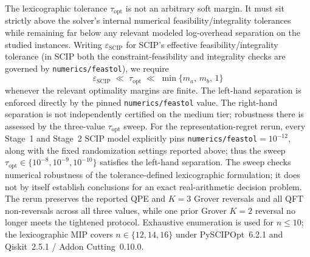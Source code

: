 \documentclass[11pt]{article}
\begin{document}
The lexicographic tolerance $\tau_{\mathrm{opt}}$ is not an arbitrary soft margin. It must sit strictly above the solver's internal numerical feasibility/integrality tolerances while remaining far below any relevant modeled log-overhead separation on the studied instances. Writing $\varepsilon_{\mathrm{SCIP}}$ for SCIP's effective feasibility/integrality tolerance (in SCIP both the constraint-feasibility and integrality checks are governed by \texttt{numerics/feastol}), we require
\begin{equation}
  \varepsilon_{\mathrm{SCIP}}
  \;\ll\;
  \tau_{\mathrm{opt}}
  \;\ll\;
  \min\bigl\{m_a,\,m_b,\,1\bigr\}
  \label{eq:tau-hierarchy}
\end{equation}
whenever the relevant optimality margins are finite. The left-hand separation is enforced directly by the pinned \texttt{numerics/feastol} value. The right-hand separation is not independently certified on the medium tier; robustness there is assessed by the three-value $\tau_{\mathrm{opt}}$ sweep. For the representation-regret rerun, every Stage~1 and Stage~2 SCIP model explicitly pins \texttt{numerics/feastol}$=10^{-12}$, along with the fixed randomization settings reported above; thus the sweep $\tau_{\mathrm{opt}}\in\{10^{-8},10^{-9},10^{-10}\}$ satisfies the left-hand separation. The sweep checks numerical robustness of the tolerance-defined lexicographic formulation; it does not by itself establish conclusions for an exact real-arithmetic decision problem. The rerun preserves the reported QPE and $K=3$ Grover reversals and all QFT non-reversals across all three values, while one prior Grover $K=2$ reversal no longer meets the tightened protocol. Exhaustive enumeration is used for $n\le10$; the lexicographic MIP covers $n\in\{12,14,16\}$ under PySCIPOpt~6.2.1 and Qiskit~2.5.1 / Addon Cutting~0.10.0.
\end{document}
